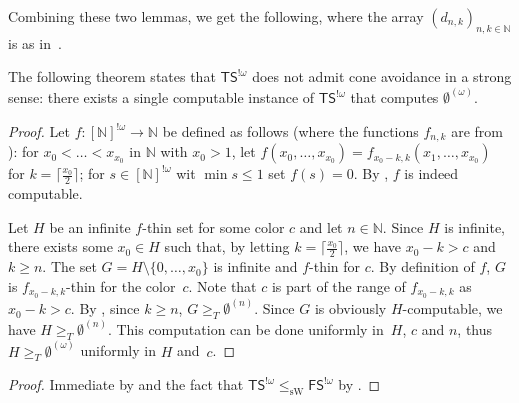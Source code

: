 \documentclass[10pt,a4paper]{article}
\newcommand{\FS}[0]{\mathsf{FS}}
\newcommand{\TS}[0]{\mathsf{TS}}
\newcommand{\NN}[0]{\mathbb{N}}
\newcommand{\sW}{\mathrm{sW}}
\newtheorem{theorem}{Theorem}
\numberwithin{theorem}{section}
\newtheorem{lemma}[theorem]{Lemma}
\newtheorem{corollary}[theorem]{Corollary}
\begin{document}
Combining these two lemmas, we get the following, where the array $(d_{n,k})_{n,k\in\NN}$ is as in~.


The following theorem states that $\TS^{!\omega}$ does not admit cone avoidance in a strong sense: there exists a single computable instance of $\TS^{!\omega}$ that computes $\emptyset^{(\omega)}$.


\begin{proof}
Let $f : [\NN]^{!\omega} \to \NN$ be defined as follows (where the functions $f_{n,k}$ are from ): for $x_0 < \dots < x_{x_0}$ in $\NN$ with $x_0 > 1$, let $f(x_0, \dots, x_{x_0})= f_{x_0 - k, k}(x_1, \dots, x_{x_0})$ for $k = \lceil \frac{x_0}{2} \rceil$; for $s \in [\NN]^{!\omega}$ wit $\min s \leq 1$ set $f(s) = 0$. By , $f$ is indeed computable.

Let $H$ be an infinite $f$-thin set for some color $c$ and let $n \in \NN$. Since $H$ is infinite, there exists some $x_0 \in H$ such that, by letting $k = \lceil \frac{x_0}{2} \rceil$, we have $x_0 - k > c$ and $k \geq n$. The set $G = H \setminus \{0, \dots, x_0\}$ is infinite and $f$-thin for $c$. By definition of $f$, $G$ is $f_{x_0 - k, k}$-thin for the color~$c$. Note that $c$ is part of the range of $f_{x_0 - k, k}$ as $x_0 - k > c$. By , since $k \geq n$, $G \geq_T \emptyset^{(n)}$. Since $G$ is obviously $H$-computable, we have $H\geq_T \emptyset^{(n)}$.
This computation can be done uniformly in~$H$, $c$ and $n$, thus $H \geq_T \emptyset^{(\omega)}$ uniformly in $H$ and~$c$.
\end{proof}

\begin{proof}
Immediate by  and the fact that $\TS^{!\omega} \leq_{\sW} \FS^{!\omega}$ by .
\end{proof}
\end{document}
